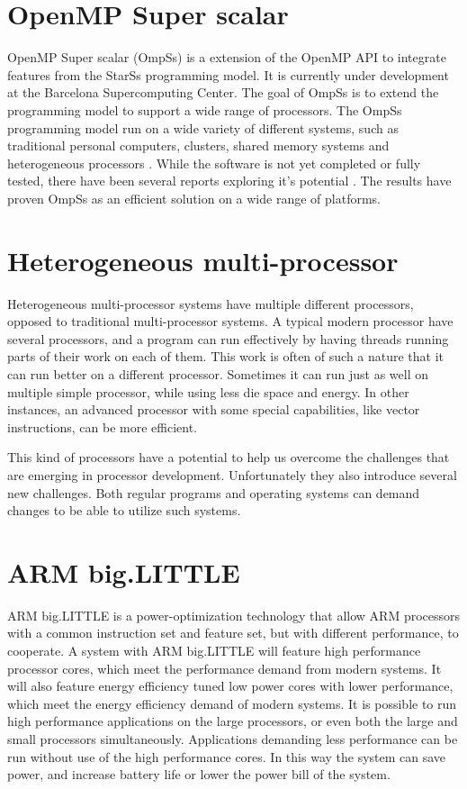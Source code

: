 \section[OmpSs]{OpenMP Super scalar}
OpenMP Super scalar (OmpSs) is a extension of the OpenMP API to integrate features from the StarSs programming model.
It is currently under development at the Barcelona Supercomputing Center.
The goal of OmpSs is to extend the programming model to support a wide range of processors.
The OmpSs programming model run on a wide variety of different systems, such as traditional personal computers, clusters, shared memory systems and heterogeneous processors \cite{ompssmanual}.
While the software is not yet completed or fully tested, there have been several reports exploring it's potential \cite{lillesand13}\cite{natvig12}.
The results have proven OmpSs as an efficient solution on a wide range of platforms.


\section{Heterogeneous multi-processor}
Heterogeneous multi-processor systems have multiple different processors, opposed to traditional multi-processor systems.
A typical modern processor have several processors, and a program can run effectively by having threads running parts of their work on each of them.
This work is often of such a nature that it can run better on a different processor.
Sometimes it can run just as well on multiple simple processor, while using less die space and energy.
In other instances, an advanced processor with some special capabilities, like vector instructions, can be more efficient.

This kind of processors have a potential to help us overcome the challenges that are emerging in processor development.
Unfortunately they also introduce several new challenges.
Both regular programs and operating systems can demand changes to be able to utilize such systems.

\section{ARM big.LITTLE} \label{bigLITTLE}
ARM big.LITTLE is a power-optimization technology that allow ARM processors with a common instruction set and feature set, but with different performance, to cooperate.
A system with ARM big.LITTLE will feature high performance processor cores, which meet the performance demand from modern systems.
It will also feature energy efficiency tuned low power cores with lower performance, which meet the energy efficiency demand of modern systems.
It is possible to run high performance applications on the large processors, or even both the large and small processors simultaneously.
Applications demanding less performance can be run without use of the high performance cores.
In this way the system can save power, and increase battery life or lower the power bill of the system.

